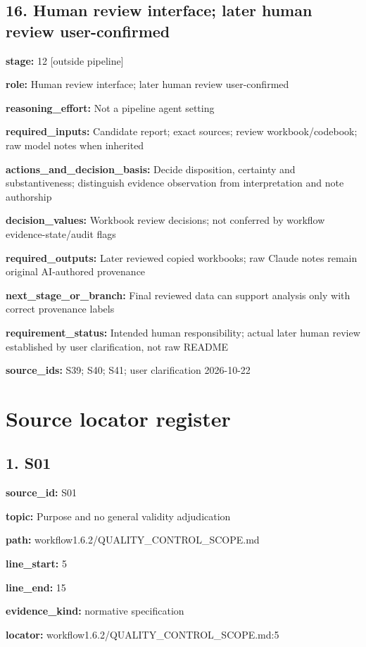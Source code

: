\documentclass[10pt,a4paper]{article}
\begin{document}
\subsection*{16.\allowbreak{} Human review interface; later human review user-\allowbreak{}confirmed}
\textbf{stage:} 12 [outside pipeline]\par
\textbf{role:} Human review interface; later human review user-\allowbreak{}confirmed\par
\textbf{reasoning\_\allowbreak{}effort:} Not a pipeline agent setting\par
\textbf{required\_\allowbreak{}inputs:} Candidate report; exact sources; review workbook/\allowbreak{}codebook; raw model notes when inherited\par
\textbf{actions\_\allowbreak{}and\_\allowbreak{}decision\_\allowbreak{}basis:} Decide disposition, certainty and substantiveness; distinguish evidence observation from interpretation and note authorship\par
\textbf{decision\_\allowbreak{}values:} Workbook review decisions; not conferred by workflow evidence-\allowbreak{}state/\allowbreak{}audit flags\par
\textbf{required\_\allowbreak{}outputs:} Later reviewed copied workbooks; raw Claude notes remain original AI-\allowbreak{}authored provenance\par
\textbf{next\_\allowbreak{}stage\_\allowbreak{}or\_\allowbreak{}branch:} Final reviewed data can support analysis only with correct provenance labels\par
\textbf{requirement\_\allowbreak{}status:} Intended human responsibility; actual later human review established by user clarification, not raw README\par
\textbf{source\_\allowbreak{}ids:} S39; S40; S41; user clarification 2026-\allowbreak{}10-\allowbreak{}22\par
\clearpage\section{Source locator register}
\subsection*{1.\allowbreak{} S01}
\textbf{source\_\allowbreak{}id:} S01\par
\textbf{topic:} Purpose and no general validity adjudication\par
\textbf{path:} workflow1.\allowbreak{}6.\allowbreak{}2/\allowbreak{}QUALITY\_\allowbreak{}CONTROL\_\allowbreak{}SCOPE.\allowbreak{}md\par
\textbf{line\_\allowbreak{}start:} 5\par
\textbf{line\_\allowbreak{}end:} 15\par
\textbf{evidence\_\allowbreak{}kind:} normative specification\par
\textbf{locator:} workflow1.\allowbreak{}6.\allowbreak{}2/\allowbreak{}QUALITY\_\allowbreak{}CONTROL\_\allowbreak{}SCOPE.\allowbreak{}md:5\par
\end{document}
